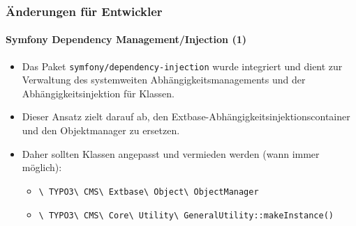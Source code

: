 \begin{frame}[fragile]
	\frametitle{Änderungen für Entwickler}
	\framesubtitle{Symfony Dependency Management/Injection (1)}

	\begin{itemize}
		\item Das Paket \texttt{symfony/dependency-injection} wurde integriert und dient
			zur Verwaltung des systemweiten Abhängigkeitsmanagements und der Abhängigkeitsinjektion 
			für Klassen.

		\item Dieser Ansatz zielt darauf ab, den Extbase-Abhängigkeitsinjektionscontainer 
			und den Objektmanager zu ersetzen.

		\item Daher sollten Klassen angepasst und vermieden werden (wann immer möglich):

			\begin{itemize}\small
				\item \texttt{\textbackslash
					TYPO3\textbackslash
					CMS\textbackslash
					Extbase\textbackslash
					Object\textbackslash
					ObjectManager}
				\item \texttt{\textbackslash
					TYPO3\textbackslash
					CMS\textbackslash
					Core\textbackslash
					Utility\textbackslash
					GeneralUtility::makeInstance()}
			\end{itemize}\normalsize

	\end{itemize}

\end{frame}


